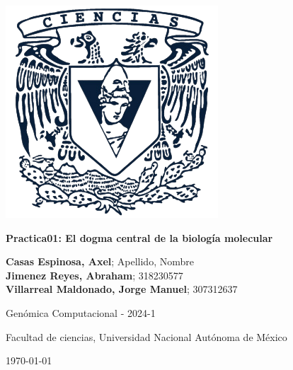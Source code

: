 \hfill
\begin{minipage}{0.18\textwidth}
    \includegraphics[width=\textwidth]{figuras/facultad-de-ciencias.png} %
\end{minipage}
\hspace{25pt}
\begin{minipage}{0.75\textwidth}

    \Large{\textbf{Practica01: El dogma central de la biología molecular}} %
    \vspace{4mm}
    
    \large{\textbf{Casas Espinosa, Axel}; Apellido, Nombre} \\
    \large{\textbf{Jimenez Reyes, Abraham}; 318230577 } \\
    \large{\textbf{Villarreal Maldonado, Jorge Manuel}; 307312637}
    \vspace{2mm}
    
    Genómica Computacional - 2024-1 
    
    Facultad de ciencias, Universidad Nacional Autónoma de México 
    \vspace{1mm} 
    
    \today %

\end{minipage}